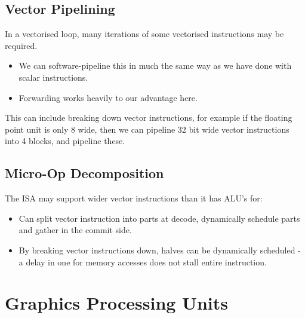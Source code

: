 \subsection{Vector Pipelining}
In a vectorised loop, many iterations of some vectorised instructions may be required.
\begin{itemize}
	\item We can software-pipeline this in much the same way as we have done with scalar instructions.
	\item Forwarding works heavily to our advantage here.
\end{itemize}
This can include breaking down vector instructions, for example if the floating point unit is only $8$ wide, then we can pipeline $32$ bit wide vector instructions into 4 blocks, and pipeline these.

\subsection{Micro-Op Decomposition}
The ISA may support wider vector instructions than it has ALU's for:
\begin{itemize}
	\item Can split vector instruction into parts at decode, dynamically schedule parts and gather in the commit side.
	\item By breaking vector instructions down, halves can be dynamically scheduled - a delay in one for memory accesses does not stall entire instruction.
\end{itemize}

\section{Graphics Processing Units}

\unfinished

